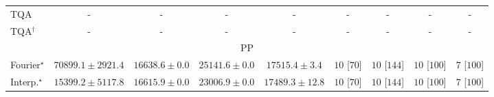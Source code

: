 \begin{tabular}{l|cccc|cccc|}
TQA & {\cellcolor[HTML]{000000}} \color[HTML]{F1F1F1} {\cellcolor{white}} \color{black} - & {\cellcolor[HTML]{000000}} \color[HTML]{F1F1F1} {\cellcolor{white}} \color{black} - & {\cellcolor[HTML]{000000}} \color[HTML]{F1F1F1} {\cellcolor{white}} \color{black} - & {\cellcolor[HTML]{000000}} \color[HTML]{F1F1F1} {\cellcolor{white}} \color{black} - & {\cellcolor[HTML]{000000}} \color[HTML]{F1F1F1} {\cellcolor{white}} \color{black} - & {\cellcolor[HTML]{000000}} \color[HTML]{F1F1F1} {\cellcolor{white}} \color{black} - & {\cellcolor[HTML]{000000}} \color[HTML]{F1F1F1} {\cellcolor{white}} \color{black} - & {\cellcolor[HTML]{000000}} \color[HTML]{F1F1F1} {\cellcolor{white}} \color{black} - \\
TQA$^\dagger$ & {\cellcolor[HTML]{000000}} \color[HTML]{F1F1F1} {\cellcolor{white}} \color{black} - & {\cellcolor[HTML]{000000}} \color[HTML]{F1F1F1} {\cellcolor{white}} \color{black} - & {\cellcolor[HTML]{000000}} \color[HTML]{F1F1F1} {\cellcolor{white}} \color{black} - & {\cellcolor[HTML]{000000}} \color[HTML]{F1F1F1} {\cellcolor{white}} \color{black} - & {\cellcolor[HTML]{000000}} \color[HTML]{F1F1F1} {\cellcolor{white}} \color{black} - & {\cellcolor[HTML]{000000}} \color[HTML]{F1F1F1} {\cellcolor{white}} \color{black} - & {\cellcolor[HTML]{000000}} \color[HTML]{F1F1F1} {\cellcolor{white}} \color{black} - & {\cellcolor[HTML]{000000}} \color[HTML]{F1F1F1} {\cellcolor{white}} \color{black} - \\
\cline{1-9}
\multicolumn{9}{c}{\rule{0pt}{8pt}PP} \\
\midrule
Fourier$^\star$ & {\cellcolor[HTML]{004529}} \color[HTML]{F1F1F1} $70899.1\pm 2921.4$ & {\cellcolor[HTML]{FBFDCF}} \color[HTML]{000000} $16638.6\pm 0.0$ & {\cellcolor[HTML]{E3F4AA}} \color[HTML]{000000} $25141.6\pm 0.0$ & {\cellcolor[HTML]{FAFDC9}} \color[HTML]{000000} $17515.4\pm 3.4$ & {\cellcolor[HTML]{49006A}} \color[HTML]{F1F1F1} $10$ [$70$] & {\cellcolor[HTML]{49006A}} \color[HTML]{F1F1F1} $10$ [$144$] & {\cellcolor[HTML]{49006A}} \color[HTML]{F1F1F1} $10$ [$100$] & {\cellcolor[HTML]{CD238F}} \color[HTML]{F1F1F1} $7$ [$100$] \\
Interp.$^\star$ & {\cellcolor[HTML]{FCFED7}} \color[HTML]{000000} $15399.2\pm 5117.8$ & {\cellcolor[HTML]{FBFDCF}} \color[HTML]{000000} $16615.9\pm 0.0$ & {\cellcolor[HTML]{ECF7B1}} \color[HTML]{000000} $23006.9\pm 0.0$ & {\cellcolor[HTML]{FAFDC9}} \color[HTML]{000000} $17489.3\pm 12.8$ & {\cellcolor[HTML]{49006A}} \color[HTML]{F1F1F1} $10$ [$70$] & {\cellcolor[HTML]{49006A}} \color[HTML]{F1F1F1} $10$ [$144$] & {\cellcolor[HTML]{49006A}} \color[HTML]{F1F1F1} $10$ [$100$] & {\cellcolor[HTML]{CD238F}} \color[HTML]{F1F1F1} $7$ [$100$] \\

\end{tabular}
